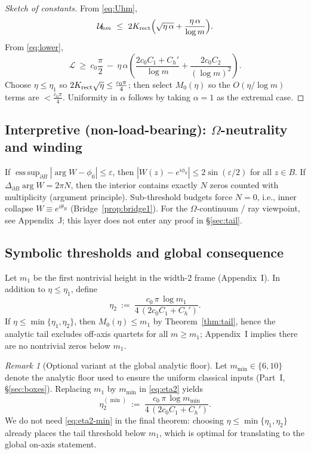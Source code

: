 \documentclass[11pt]{article}
\numberwithin{equation}{section}
\theoremstyle{remark}
\newtheorem{remark}[theorem]{Remark}
\begin{document}
\begin{proof}[Sketch of constants]
From \eqref{eq:Uhm},
\[
\mathcal{U}_{\!hm}\ \le\ 2K_{\rm rect}\Big(\sqrt{\eta\,\alpha}+\frac{\eta\,\alpha}{\log m}\Big).
\]
From \eqref{eq:lower},
\[
\mathcal{L}\ \ge\ c_0\frac{\pi}{2}\ -\ \eta\,\alpha\left(\frac{2c_0C_1+C_h'}{\log m}+\frac{2c_0C_2}{(\log m)^2}\right).
\]
Choose $\eta\le\eta_1$ so $2K_{\rm rect}\sqrt{\eta}\le \tfrac{c_0\pi}{4}$; then select $M_0(\eta)$ so the $O(\eta/\log m)$ terms are $<\tfrac{c_0\pi}{4}$. Uniformity in $\alpha$ follows by taking $\alpha=1$ as the extremal case.
\end{proof}

\subsection{Interpretive (non-load-bearing): $\Omega$-neutrality and winding}\label{subsec:omega}

If $\operatorname*{ess\,sup}_{\partial B}|\arg W-\phi_0|\le \varepsilon$, then $|W(z)-e^{i\phi_0}|\le 2\sin(\varepsilon/2)$ for all $z\in B$. If $\Delta_{\partial B}\arg W=2\pi N$, then the interior contains exactly $N$ zeros counted with multiplicity (argument principle). Sub-threshold budgets force $N=0$, i.e., inner collapse $W\equiv e^{i\theta_B}$ (Bridge~\ref{prop:bridge1}). For the $\Omega$-continuum / ray viewpoint, see Appendix~J; this layer does not enter any proof in \S\ref{sec:tail}.

\subsection{Symbolic thresholds and global consequence}\label{subsec:thresholds}

Let $m_1$ be the first nontrivial height in the width-2 frame (Appendix~I). In addition to $\eta\le\eta_1$, define
\begin{equation}\label{eq:eta2}\tag{4.5}
\eta_2\ :=\ \frac{c_0\,\pi\,\log m_1}{4\,(2c_0C_1+C_h')}.
\end{equation}
If $\eta\le \min\{\eta_1,\eta_2\}$, then $M_0(\eta)\le m_1$ by Theorem~\ref{thm:tail}, hence the analytic tail excludes off-axis quartets for all $m\ge m_1$; Appendix~I implies there are no nontrivial zeros below $m_1$.

\begin{remark}[Optional variant at the global analytic floor]
Let $m_{\min}\in\{6,10\}$ denote the analytic floor used to ensure the uniform classical inputs (Part~I, §\ref{sec:boxes}). Replacing $m_1$ by $m_{\min}$ in \eqref{eq:eta2} yields
\begin{equation}\label{eq:eta2-min}\tag{4.5.1}
\eta_2^{(\min)}\ :=\ \frac{c_0\,\pi\,\log m_{\min}}{4\,(2c_0C_1+C_h')}.
\end{equation}
We do not need \eqref{eq:eta2-min} in the final theorem: choosing $\eta\le\min\{\eta_1,\eta_2\}$ already places the tail threshold below $m_1$, which is optimal for translating to the global on-axis statement.
\end{remark}
\end{document}
